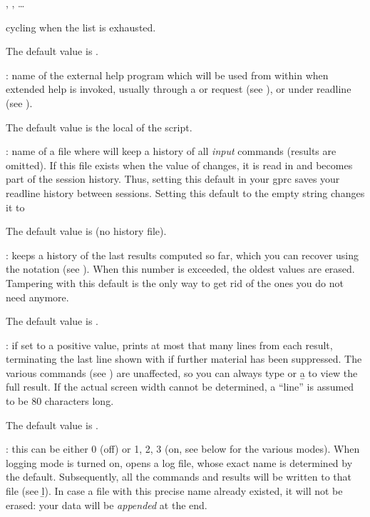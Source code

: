 , ,
  \dots

cycling when the  list is exhausted.

The default value is \kbd{[4,5]}.

: \label{se:def,help}name of the external help program which will be used from within
 when extended help is invoked, usually through a  or
 request (see ), or  under readline (see
).

The default value is the local of the  script.

: \label{se:def,histfile}name of a file where
 will keep a history of all \emph{input} commands (results are
omitted). If this file exists when the value of  changes,
it is read in and becomes part of the session history. Thus, setting this
default in your gprc saves your readline history between sessions. Setting
this default to the empty string  changes it to

The default value is  (no history file).

: \label{se:def,histsize} keeps a history of the last
 results computed so far, which you can recover using the
\kbd{\%} notation (see ). When this number is exceeded,
the oldest values are erased. Tampering with this default is the only way to
get rid of the ones you do not need anymore.

The default value is .

: \label{se:def,lines}if set to a positive value,  prints at
most that many lines from each result, terminating the last line shown with
\kbd{[+++]} if further material has been suppressed. The various 
commands (see ) are unaffected, so you can always type
 or \b{a} to view the full result. If the actual screen width
cannot be determined, a ``line'' is assumed to be 80 characters long.

The default value is .

: \label{se:def,log}this can be either 0 (off) or 1, 2, 3
(on, see below for the various modes). When logging mode is turned on, 
opens a log file, whose exact name is determined by the 
default. Subsequently, all the commands and results will be written to that
file (see \b{l}). In case a file with this precise name already existed, it
will not be erased: your data will be \emph{appended} at the end.

